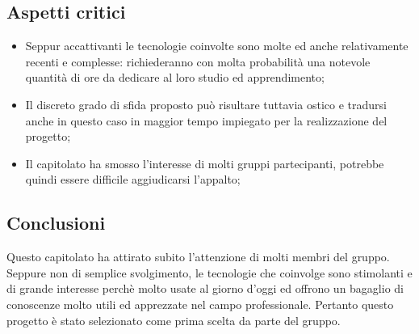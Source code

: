 \subsection{Aspetti critici}
\begin{itemize}
\item Seppur accattivanti le tecnologie coinvolte sono molte ed anche relativamente recenti e complesse: richiederanno con molta probabilità una notevole quantità di ore da dedicare al loro studio ed apprendimento;
\item Il discreto grado di sfida proposto può risultare tuttavia ostico e tradursi anche in questo caso in maggior tempo impiegato per la realizzazione del progetto;
\item Il capitolato ha smosso l'interesse di molti gruppi partecipanti, potrebbe quindi essere difficile aggiudicarsi l'appalto;
\end{itemize}

\subsection{Conclusioni}
Questo capitolato ha attirato subito l'attenzione di molti membri del gruppo. Seppure non di semplice svolgimento, le tecnologie che coinvolge sono stimolanti e di grande interesse perchè molto usate al giorno d'oggi ed offrono un bagaglio di conoscenze molto utili ed apprezzate nel campo professionale. Pertanto questo progetto è stato selezionato come prima scelta da parte del gruppo.
